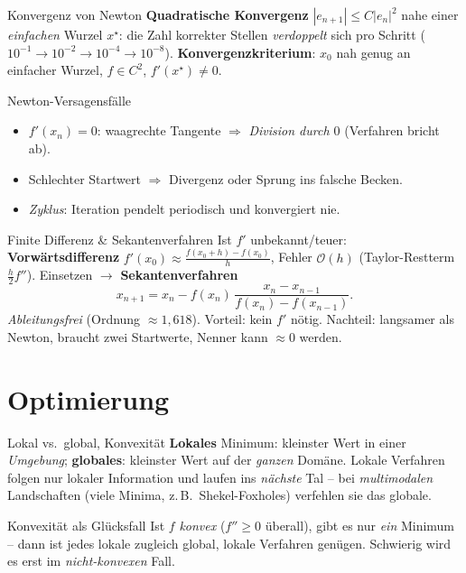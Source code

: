 \documentclass[a4paper,11pt]{article}
\begin{document}
\begin{defi}{Konvergenz von Newton}
\textbf{Quadratische Konvergenz} $|e_{n+1}|\le C|e_n|^2$ nahe einer \emph{einfachen} Wurzel
$x^\star$: die Zahl korrekter Stellen \emph{verdoppelt} sich pro Schritt
($10^{-1}\!\to\!10^{-2}\!\to\!10^{-4}\!\to\!10^{-8}$).
\textbf{Konvergenzkriterium}: $x_0$ nah genug an einfacher Wurzel, $f\in C^2$, $f'(x^\star)\neq 0$.
\end{defi}

\begin{falle}{Newton-Versagensfälle}
\begin{itemize}
\item $f'(x_n)=0$: waagrechte Tangente $\Rightarrow$ \emph{Division durch $0$} (Verfahren bricht ab).
\item Schlechter Startwert $\Rightarrow$ Divergenz oder Sprung ins falsche Becken.
\item \emph{Zyklus}: Iteration pendelt periodisch und konvergiert nie.
\end{itemize}
\end{falle}

\begin{satz}{Finite Differenz \& Sekantenverfahren}
Ist $f'$ unbekannt/teuer: \textbf{Vorwärtsdifferenz}
$f'(x_0)\approx\frac{f(x_0+h)-f(x_0)}{h}$, Fehler $\mathcal O(h)$ (Taylor-Restterm $\tfrac h2 f''$).
Einsetzen $\to$ \textbf{Sekantenverfahren}
\[
  x_{n+1}=x_n-f(x_n)\,\frac{x_n-x_{n-1}}{f(x_n)-f(x_{n-1})}.
\]
\emph{Ableitungsfrei} (Ordnung $\approx1{,}618$). Vorteil: kein $f'$ nötig. Nachteil: langsamer als
Newton, braucht zwei Startwerte, Nenner kann $\approx0$ werden.
\end{satz}

\section{Optimierung}

\begin{defi}{Lokal vs.\ global, Konvexität}
\textbf{Lokales} Minimum: kleinster Wert in einer \emph{Umgebung}; \textbf{globales}: kleinster Wert
auf der \emph{ganzen} Domäne. Lokale Verfahren folgen nur lokaler Information und laufen ins
\emph{nächste} Tal -- bei \emph{multimodalen} Landschaften (viele Minima, z.\,B.\ Shekel-Foxholes)
verfehlen sie das globale.
\end{defi}

\begin{intu}{Konvexität als Glücksfall}
Ist $f$ \emph{konvex} ($f''\ge 0$ überall), gibt es nur \emph{ein} Minimum -- dann ist jedes lokale
zugleich global, lokale Verfahren genügen. Schwierig wird es erst im \emph{nicht-konvexen} Fall.
\end{intu}
\end{document}
